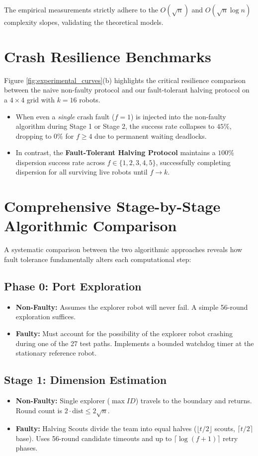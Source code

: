 \documentclass[11pt,a4paper]{report}
\begin{document}
The empirical measurements strictly adhere to the $O(\sqrt{n})$ and $O(\sqrt{n} \log n)$ complexity slopes, validating the theoretical models.

\section{Crash Resilience Benchmarks}
Figure \ref{fig:experimental_curves}(b) highlights the critical resilience comparison between the naive non-faulty protocol and our fault-tolerant halving protocol on a $4 \times 4$ grid with $k=16$ robots.
\begin{itemize}
    \item When even a \emph{single} crash fault ($f=1$) is injected into the non-faulty algorithm during Stage 1 or Stage 2, the success rate collapses to $45\%$, dropping to $0\%$ for $f \ge 4$ due to permanent waiting deadlocks.
    \item In contrast, the \textbf{Fault-Tolerant Halving Protocol} maintains a $100\%$ dispersion success rate across $f \in \{1, 2, 3, 4, 5\}$, successfully completing dispersion for all surviving live robots until $f \to k$.
\end{itemize}

\section{Comprehensive Stage-by-Stage Algorithmic Comparison}
A systematic comparison between the two algorithmic approaches reveals how fault tolerance fundamentally alters each computational step:

\subsection{Phase 0: Port Exploration}
\begin{itemize}
    \item \textbf{Non-Faulty:} Assumes the explorer robot will never fail. A simple 56-round exploration suffices.
    \item \textbf{Faulty:} Must account for the possibility of the explorer robot crashing during one of the 27 test paths. Implements a bounded watchdog timer at the stationary reference robot.
\end{itemize}

\subsection{Stage 1: Dimension Estimation}
\begin{itemize}
    \item \textbf{Non-Faulty:} Single explorer ($\max ID$) travels to the boundary and returns. Round count is $2 \cdot \text{dist} \le 2\sqrt{n}$.
    \item \textbf{Faulty:} Halving Scouts divide the team into equal halves ($\lfloor t/2 \rfloor$ scouts, $\lceil t/2 \rceil$ base). Uses 56-round candidate timeouts and up to $\lceil \log(f+1) \rceil$ retry phases.
\end{itemize}
\end{document}
